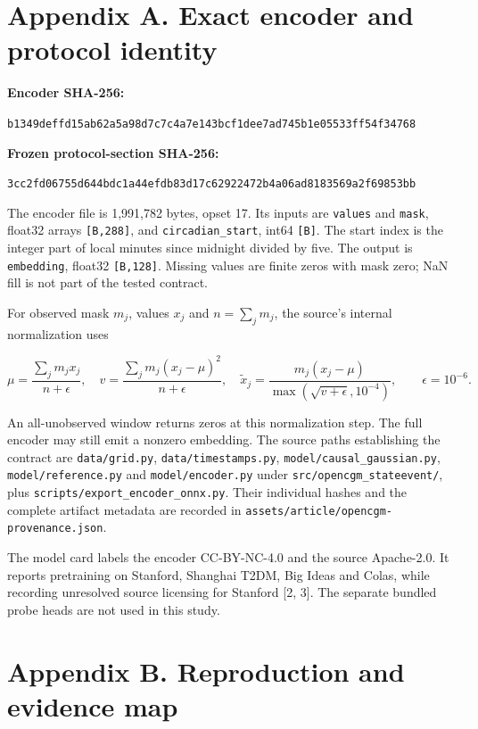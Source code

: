 \documentclass[11pt,letterpaper]{article}
\begin{document}
\section{Appendix A. Exact encoder and protocol
identity}\label{appendix-a.-exact-encoder-and-protocol-identity}

\textbf{Encoder SHA-256:}

{\ttfamily\nolinkurl{b1349deffd15ab62a5a98d7c7c4a7e143bcf1dee7ad745b1e05533ff54f34768}}

\textbf{Frozen protocol-section SHA-256:}

{\ttfamily\nolinkurl{3cc2fd06755d644bdc1a44efdb83d17c62922472b4a06ad8183569a2f69853bb}}

The encoder file is 1,991,782 bytes, opset 17. Its inputs are
\texttt{values} and \texttt{mask}, float32 arrays \texttt{{[}B,288{]}},
and \texttt{circadian\_start}, int64 \texttt{{[}B{]}}. The start index
is the integer part of local minutes since midnight divided by five. The
output is \texttt{embedding}, float32 \texttt{{[}B,128{]}}. Missing
values are finite zeros with mask zero; NaN fill is not part of the
tested contract.

For observed mask \(m_j\), values \(x_j\) and \(n=\sum_jm_j\), the
source's internal normalization uses

\[
\mu=\frac{\sum_jm_jx_j}{n+\epsilon},\quad
v=\frac{\sum_jm_j(x_j-\mu)^2}{n+\epsilon},\quad
\tilde x_j=\frac{m_j(x_j-\mu)}{\max(\sqrt{v+\epsilon},10^{-4})},
\qquad \epsilon=10^{-6}.
\]

An all-unobserved window returns zeros at this normalization step. The
full encoder may still emit a nonzero embedding. The source paths
establishing the contract are \texttt{data/grid.py},
\texttt{data/timestamps.py}, {\ttfamily\nolinkurl{model/causal_gaussian.py}},
\texttt{model/reference.py} and \texttt{model/encoder.py} under
{\ttfamily\nolinkurl{src/opencgm_stateevent/}}, plus
{\ttfamily\nolinkurl{scripts/export_encoder_onnx.py}}. Their individual hashes and
the complete artifact metadata are recorded in
{\ttfamily\nolinkurl{assets/article/opencgm-provenance.json}}.

The model card labels the encoder CC-BY-NC-4.0 and the source
Apache-2.0. It reports pretraining on Stanford, Shanghai T2DM, Big Ideas
and Colas, while recording unresolved source licensing for Stanford
{[}2, 3{]}. The separate bundled probe heads are not used in this study.

\section{Appendix B. Reproduction and evidence
map}\label{appendix-b.-reproduction-and-evidence-map}
\end{document}
